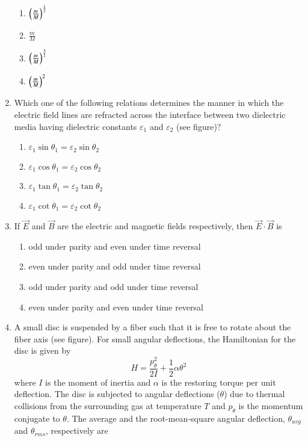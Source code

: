 \documentclass[journal]{IEEEtran}
\begin{document}
\begin{enumerate}
\begin{enumerate}
\item $\left(\frac{m}{M}\right)^{\frac{1}{2}}$
\item $\frac{m}{M}$
\item $\left(\frac{m}{M}\right)^{\frac{3}{2}}$
\item $\left(\frac{m}{M}\right)^2$
\end{enumerate}

\item Which one of the following relations determines the manner in which the electric field lines are refracted across the interface between two dielectric media having dielectric constants $\varepsilon_1$ and $\varepsilon_2$ (see figure)?



\begin{enumerate}
\item $\varepsilon_1\sin{\theta_1}=\varepsilon_2\sin{\theta_2}$
\item $\varepsilon_1\cos{\theta_1}=\varepsilon_2\cos{\theta_2}$
\item $\varepsilon_1\tan{\theta_1}=\varepsilon_2\tan{\theta_2}$
\item $\varepsilon_1\cot{\theta_1}=\varepsilon_2\cot{\theta_2}$
\end{enumerate}

\item If $\vec{E}$ and $\vec{B}$ are the electric and magnetic fields respectively, then $\vec{E}\cdot\vec{B}$ is

\begin{enumerate}
\item odd under parity and even under time reversal
\item even under parity and odd under time reversal
\item odd under parity and odd under time reversal
\item even under parity and even under time reversal
\end{enumerate}

\item A small disc is suspended by a fiber such that it is free to rotate about the fiber axis (see figure). For small angular deflections, the Hamiltonian for the disc is given by $$H=\frac{p^2_\theta}{2I}+\frac{1}{2}\alpha\theta^2$$ where $I$ is the moment of inertia and $\alpha$ is the restoring torque per unit deflection. The disc is subjected to angular deflections ($\theta$) due to thermal collisions from the surrounding gas at temperature $T$ and $p_\theta$ is the momentum conjugate to $\theta$. The average and the root-mean-square angular deflection, $\theta_{avg}$ and $\theta_{rms}$, respectively are


\end{enumerate}
\end{document}
